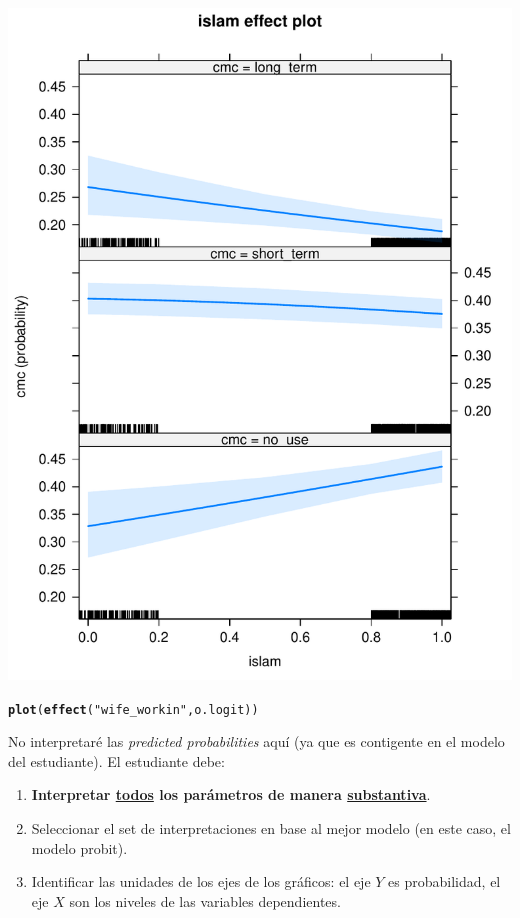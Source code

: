 \documentclass[onesided]{article}\usepackage[]{graphicx}\usepackage[]{color}
\makeatletter
\def\maxwidth{ %
  \ifdim\Gin@nat@width>\linewidth
    \linewidth
  \else
    \Gin@nat@width
  \fi
}
\newcommand{\hlstr}[1]{\textcolor[rgb]{0.192,0.494,0.8}{#1}}%
\newcommand{\hlstd}[1]{\textcolor[rgb]{0.345,0.345,0.345}{#1}}%
\newcommand{\hlkwd}[1]{\textcolor[rgb]{0.737,0.353,0.396}{\textbf{#1}}}%
\newenvironment{kframe}{%
 \def\at@end@of@kframe{}%
 \ifinner\ifhmode%
  \def\at@end@of@kframe{\end{minipage}}%
  \begin{minipage}{\columnwidth}%
 \fi\fi%
 \def\FrameCommand##1{\hskip\@totalleftmargin \hskip-\fboxsep
 \colorbox{shadecolor}{##1}\hskip-\fboxsep
     \hskip-\linewidth \hskip-\@totalleftmargin \hskip\columnwidth}%
 \MakeFramed {\advance\hsize-\width
   \@totalleftmargin\z@ \linewidth\hsize
   \@setminipage}}%
 {\par\unskip\endMakeFramed%
 \at@end@of@kframe}
\newenvironment{knitrout}{}{} %
\makeatother
\begin{document}
\begin{knitrout}
{\centering \includegraphics[width=\maxwidth]{figure/pp-4} 

}


\begin{kframe}\begin{alltt}
\hlkwd{plot}\hlstd{(}\hlkwd{effect}\hlstd{(}\hlstr{"wife_workin"}\hlstd{, o.logit))}
\end{alltt}


{\ttfamily\noindent\bfseries\color{errorcolor}{\#\# Error in Analyze.model(focal.predictors, mod, xlevels, default.levels, : the following predictor is not in the model: wife\_workin}}\end{kframe}
\end{knitrout}

No interpretar\'e las \emph{predicted probabilities} aqu\'i (ya que es contigente en el modelo del estudiante). El estudiante debe:

\begin{enumerate}
\item {\bf Interpretar \underline{todos} los par\'ametros de manera \underline{substantiva}}.
\item Seleccionar el set de interpretaciones en base al mejor modelo (en este caso, el modelo probit).
\item Identificar las unidades de los ejes de los gr\'aficos: el eje $Y$ es probabilidad, el eje $X$ son los niveles de las variables dependientes.
\end{enumerate}


\end{document}
